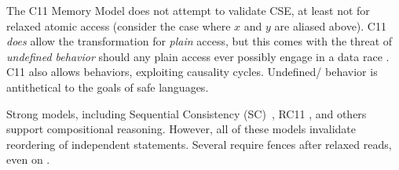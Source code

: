 


The C11 Memory Model \cite{Batty:2011:MCC:1926385.1926394} does not attempt
to validate CSE, at least not for relaxed atomic access (consider the case
where $x$ and $y$ are aliased above).  C11 \emph{does} allow the
transformation for \emph{plain} access, but this comes with the threat of
\emph{undefined behavior} should any plain access ever possibly engage in a
data race \cite{undefined}.  C11 also allows \oota{} behaviors, exploiting
causality cycles.  Undefined/\oota{} behavior is antithetical to the goals of
safe languages.




Strong models, including Sequential Consistency
(SC)~\citep{Lamport:1979:MMC:1311099.1311750}, RC11
\citep{DBLP:conf/pldi/LahavVKHD17}, and others
\citep{Dolan:2018:BDR:3192366.3192421,DBLP:conf/pldi/LahavVKHD17,DBLP:conf/lics/JeffreyR16,Boehm:2014:OGA:2618128.2618134}
support compositional reasoning.  However, all of these models invalidate
reordering of independent statements.  Several require fences after relaxed
reads, even on \armeight.


